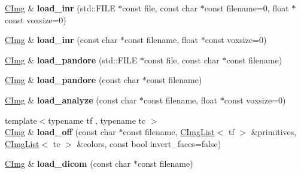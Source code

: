 \begin{DoxyCompactItemize}
\item 
\hypertarget{structcimg__library_1_1_c_img_aea6912707c7840909881ab1e58c5878f}{\hyperlink{structcimg__library_1_1_c_img}{C\-Img} \& {\bfseries load\-\_\-inr} (std\-::\-F\-I\-L\-E $\ast$const file, const char $\ast$const filename=0, float $\ast$const voxsize=0)}\label{structcimg__library_1_1_c_img_aea6912707c7840909881ab1e58c5878f}

\item 
\hypertarget{structcimg__library_1_1_c_img_a1b81aaede8c8ef2bb5b5cfa10c80ef22}{\hyperlink{structcimg__library_1_1_c_img}{C\-Img} \& {\bfseries load\-\_\-inr} (const char $\ast$const filename, float $\ast$const voxsize=0)}\label{structcimg__library_1_1_c_img_a1b81aaede8c8ef2bb5b5cfa10c80ef22}

\item 
\hypertarget{structcimg__library_1_1_c_img_ad9a5fc8140226975ce0ba87ea43e9cf8}{\hyperlink{structcimg__library_1_1_c_img}{C\-Img} \& {\bfseries load\-\_\-pandore} (std\-::\-F\-I\-L\-E $\ast$const file, const char $\ast$const filename)}\label{structcimg__library_1_1_c_img_ad9a5fc8140226975ce0ba87ea43e9cf8}

\item 
\hypertarget{structcimg__library_1_1_c_img_ab7077bc72bc1b109dd7cd76b04802628}{\hyperlink{structcimg__library_1_1_c_img}{C\-Img} \& {\bfseries load\-\_\-pandore} (const char $\ast$const filename)}\label{structcimg__library_1_1_c_img_ab7077bc72bc1b109dd7cd76b04802628}

\item 
\hypertarget{structcimg__library_1_1_c_img_a470e0987c10a253737062d45bc363767}{\hyperlink{structcimg__library_1_1_c_img}{C\-Img} \& {\bfseries load\-\_\-analyze} (const char $\ast$const filename, float $\ast$const voxsize=0)}\label{structcimg__library_1_1_c_img_a470e0987c10a253737062d45bc363767}

\item 
\hypertarget{structcimg__library_1_1_c_img_ace467f97d95c291631989a35cc8019d4}{{\footnotesize template$<$typename tf , typename tc $>$ }\\\hyperlink{structcimg__library_1_1_c_img}{C\-Img} \& {\bfseries load\-\_\-off} (const char $\ast$const filename, \hyperlink{structcimg__library_1_1_c_img_list}{C\-Img\-List}$<$ tf $>$ \&primitives, \hyperlink{structcimg__library_1_1_c_img_list}{C\-Img\-List}$<$ tc $>$ \&colors, const bool invert\-\_\-faces=false)}\label{structcimg__library_1_1_c_img_ace467f97d95c291631989a35cc8019d4}

\item 
\hypertarget{structcimg__library_1_1_c_img_a79e63ba3130af9a7e0c1b06226c4cab5}{\hyperlink{structcimg__library_1_1_c_img}{C\-Img} \& {\bfseries load\-\_\-dicom} (const char $\ast$const filename)}\label{structcimg__library_1_1_c_img_a79e63ba3130af9a7e0c1b06226c4cab5}


\end{DoxyCompactItemize}
